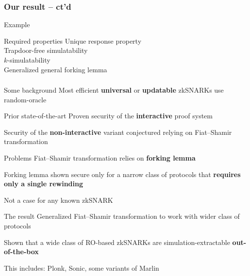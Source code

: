 \documentclass[aspectratio=169,handout]{beamer}
\renewcommand{\emph}[1]{\textbf{#1}}
\begin{document}
\begin{frame}
  \frametitle{Our result -- ct'd}
  \begin{block}{Example}
  \end{block}
  \begin{block}{Required properties}
    Unique response property\\
    Trapdoor-free simulatability\\
    $k$-simulatability \\
    Generalized general forking lemma
  \end{block}
\end{frame}

\begin{frame}
  \frametitle{}
\end{frame}

\begin{frame}
  \begin{block}{Some background}
    Most efficient \emph{universal} or \emph{updatable} zkSNARKs use random-oracle
  \end{block}\pause  

  \begin{block}{Prior state-of-the-art}
    Proven security of the \emph{interactive} proof system

    Security of the \emph{non-interactive} variant conjectured
      relying on Fiat--Shamir transformation
  \end{block}\pause

  \begin{block}{Problems}
    Fiat--Shamir transformation relies on \emph{forking lemma}

    Forking lemma shown secure only for a narrow class of protocols
    that \emph{requires only a single rewinding}

    Not a case for any known zkSNARK
  \end{block}\pause

  \begin{block}{The result}
    Generalized Fiat--Shamir transformation to work with wider class of protocols
    
     Shown that a wide class of RO-based zkSNARKs are
     simulation-extractable \emph{out-of-the-box}
     
     This includes: Plonk, Sonic, some variants of Marlin
  \end{block}
\end{frame}
\end{document}
